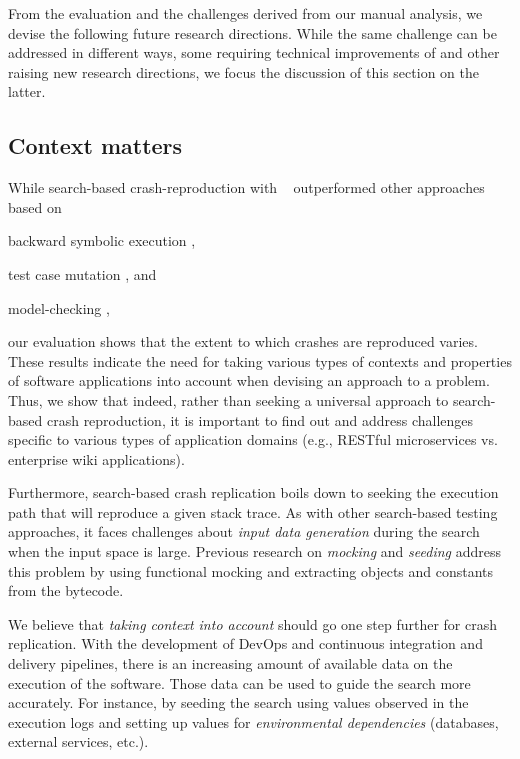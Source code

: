 
From the evaluation and the challenges derived from our manual analysis, we devise the following future research directions. 
While the same challenge can be addressed in different ways, some requiring technical improvements of \evocrash and other raising new research directions, we focus the discussion of this section on the latter. 

\subsection{Context matters}

While search-based crash-reproduction with \evocrash~\cite{soltani2017,Soltani2018a} outperformed other approaches based on \begin{inparaenum}[(i)]
\item backward symbolic execution \cite{Chen2015},
\item test case mutation \cite{Xuan2015},
and \item model-checking \cite{Nayrolles2017},
\end{inparaenum}
our evaluation shows that the extent to which crashes are reproduced varies.
These results indicate the need for taking various types of contexts and properties of software applications into account when devising an approach to a problem.
Thus, we show that indeed, rather than seeking a universal approach to search-based crash reproduction, it is important to find out and address challenges specific to various types of application domains (e.g., RESTful microservices vs. enterprise wiki applications)\cite{Arcuri2017b}.

Furthermore, search-based crash replication boils down to seeking the execution path that will reproduce a given stack trace.
As with other search-based testing approaches, it faces challenges about \emph{input data generation} during the search when the input space is large.
Previous research on \textit{mocking} and \textit{seeding} \cite{arcuri2017private,Rojas2016} address this problem by using functional mocking and extracting objects and constants from the bytecode.

We believe that \emph{taking context into account} should go one step further for crash replication.
With the development of DevOps \cite{Roche2013} and continuous integration and delivery pipelines, there is an increasing amount of available data on the execution of the software.
Those data can be used to guide the search more accurately.
For instance, by seeding the search using values observed in the execution logs and setting up values for \emph{environmental dependencies} (databases, external services, etc.).


